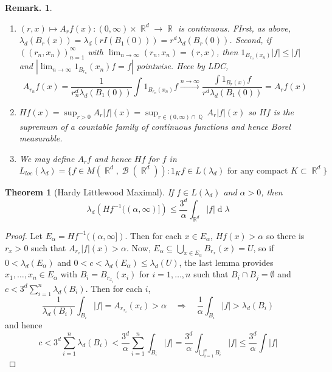 \documentclass[12pt, a4paper]{memoir}
\DeclareMathOperator{\Q}{{\mathbb{Q}}}
\DeclareMathOperator{\R}{{\mathbb{R}}}
\newtheorem{theorem}{Theorem}[section]
\theoremstyle{nonumberplain}
\newtheorem{remark}{Remark.}
\newtheorem{proof}{Proof}
\DeclareMathOperator{\B}{\mathcal{B}}
\renewcommand{\d}[1]{\ensuremath{\operatorname{d}\!{#1}}} %
\begin{document}
\begin{remark}
    \begin{enumerate}[nl,r]
        \item $(r,x)\mapsto A_rf(x):(0,\infty)\times\R^d\to\R$ is continuous.
            FIrst, as above, $\lambda_d(B_r(x))=\lambda_d(rI(B_1(0)))=r^d\lambda_d(B_r(0))$.
            Second, if $((r_n,x_n))_{n=1}^\infty$ with $\lim_{n\to\infty}(r_n,x_n)=(r,x)$, then $1_{B_{r_n}(x_n)}|f|\leq|f|$ and $|\lim_{n\to\infty}1_{B_{r_n}}(x_n)f=f|$ pointwise.
            Hece by LDC,
            \begin{equation*}
                A_{r_n}f(x)=\frac{1}{r_n^d\lambda_d(B_1(0))}\int 1_{B_{r_n}(x_n)}f\overset{n\to\infty}{\longrightarrow}\frac{\int 1_{B_r(x)}f}{r^d\lambda_d(B_1(0))}=A_rf(x)
            \end{equation*}
        \item $Hf(x)=\sup_{r>0}A_r|f|(x)=\sup_{r\in(0,\infty)\cap\Q} A_r|f|(x)$ so $Hf$ is the supremum of a countable family of continuous functions and hence Borel measurable.
        \item We may define $A_rf$ and hence $Hf$ for $f$ in
            \begin{equation*}
                L_{loc}(\lambda_d)=\{f\in M(\R^d,\B(\R^d)):1_Kf\in L(\lambda_d)\text{ for any compact }K\subset\R^d\}
            \end{equation*}
    \end{enumerate}
\end{remark}
\begin{theorem}[Hardy Littlewood Maximal]
    If $f\in L(\lambda_d)$ and $\alpha>0$, then
    \begin{equation*}
        \lambda_d\left(Hf^{-1}((\alpha,\infty)]\right)\leq\frac{3^d}{\alpha}\int_{\R^d}|f|\d{\lambda}
    \end{equation*}
\end{theorem}
\begin{proof}
    Let $E_\alpha = Hf^{-1}((\alpha,\infty])$.
    Then for each $x\in E_\alpha$, $Hf(x)>\alpha$ so there is $r_x>0$ such that $A_{r_x}|f|(x)>\alpha$.
    Now, $E_\alpha\subseteq\bigcup_{x\in E_\alpha}B_{r_x}(x)=U$, so if $0<\lambda_d(E_\alpha)$ and $0<c<\lambda_d(E_\alpha)\leq\lambda_d(U)$, the last lemma provides $x_1,\ldots,x_n\in E_\alpha$ with $B_i=B_{r_{x_i}}(x_i)$ for $i=1,\ldots,n$ such that $B_i\cap B_j=\emptyset$ and $c<3^d\sum_{i=1}^n\lambda_d(B_i)$.
    Then for each $i$,
    \begin{equation*}
        \frac{1}{\lambda_d(B_i)}\int_{B_i}|f|=A_{r_{x_i}}(x_i)>\alpha\quad\Rightarrow\quad\frac{1}{\alpha}\int_{B_i}|f|>\lambda_d(B_i)
    \end{equation*}
    and hence
    \begin{equation*}
        c<3^d\sum_{i=1}^n \lambda_d(B_i)<\frac{3^d}{\alpha}\sum_{i=1}^n\int_{B_i}|f|=\frac{3^d}{\alpha}\int_{\bigcup_{i=1}^n B_i}|f|\leq\frac{3^d}{\alpha}\int|f|
    \end{equation*}
\end{proof}
\end{document}

